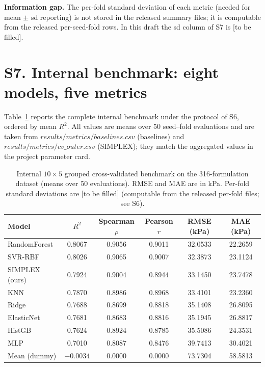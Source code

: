 \documentclass[utf8]{frontiers_suppmat}
\begin{document}
\textbf{Information gap.} The per-fold standard deviation of each metric (needed for mean $\pm$ sd reporting) is not stored in the released summary files; it is computable from the released per-seed-fold rows. In this draft the sd column of S7 is {[}to be filled{]}.

\section{S7. Internal benchmark: eight models, five metrics}

Table~\ref{tab:S7} reports the complete internal benchmark under the protocol of S6, ordered by mean $R^2$. All values are means over 50 seed--fold evaluations and are taken from $results/metrics/baselines.csv$ (baselines) and $results/metrics/cv\_outer.csv$ (SIMPLEX); they match the aggregated values in the project parameter card.

\begin{table}[h]
\centering
\caption{Internal $10 \times 5$ grouped cross-validated benchmark on the 316-formulation dataset (means over 50 evaluations). RMSE and MAE are in kPa. Per-fold standard deviations are {[}to be filled{]} (computable from the released per-fold files; see S6).}
\label{tab:S7}
\begin{tabular}{lccccc}
\toprule
Model & $R^2$ & Spearman $\rho$ & Pearson $r$ & RMSE (kPa) & MAE (kPa) \\
\midrule
RandomForest & 0.8067 & 0.9056 & 0.9011 & 32.0533 & 22.2659 \\
SVR-RBF & 0.8026 & 0.9065 & 0.9007 & 32.3873 & 23.1124 \\
SIMPLEX (ours) & 0.7924 & 0.9004 & 0.8944 & 33.1450 & 23.7478 \\
KNN & 0.7870 & 0.8986 & 0.8968 & 33.4101 & 23.2360 \\
Ridge & 0.7688 & 0.8699 & 0.8818 & 35.1408 & 26.8095 \\
ElasticNet & 0.7681 & 0.8683 & 0.8816 & 35.1945 & 26.8817 \\
HistGB & 0.7624 & 0.8924 & 0.8785 & 35.5086 & 24.3531 \\
MLP & 0.7010 & 0.8087 & 0.8476 & 39.7413 & 30.4021 \\
Mean (dummy) & $-0.0034$ & 0.0000 & 0.0000 & 73.7304 & 58.5813 \\
\bottomrule
\end{tabular}
\end{table}
\end{document}
